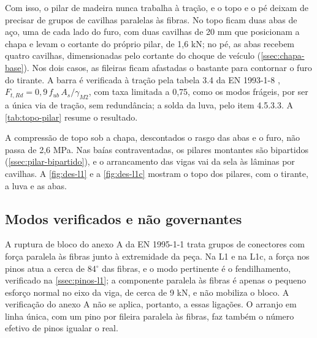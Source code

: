 Com isso, o pilar de madeira nunca trabalha à tração, e o topo e o pé deixam de
precisar de grupos de cavilhas paralelas às fibras. No topo ficam duas abas de aço,
uma de cada lado do furo, com duas cavilhas de 20 mm que posicionam a chapa e
levam o cortante do próprio pilar, de 1,6 kN; no pé, as abas recebem quatro
cavilhas, dimensionadas pelo cortante do choque de veículo
(\autoref{ssec:chapa-base}). Nos dois casos, as fileiras ficam afastadas o
bastante para contornar o furo do tirante. A barra é verificada à tração pela
tabela 3.4 da EN 1993-1-8 \cite{EN1993-1-8:2005}, $F_{t,Rd} = 0{,}9\,f_{ub}\,A_s/
\gamma_{M2}$, com taxa limitada a 0,75, como os modos frágeis, por ser a única via
de tração, sem redundância; a solda da luva, pelo item 4.5.3.3. A
\autoref{tab:topo-pilar} resume o resultado.


A compressão de topo sob a chapa, descontados o rasgo das abas e o furo, não
passa de 2,6 MPa. Nas baías contraventadas, os pilares montantes são bipartidos
(\autoref{ssec:pilar-bipartido}), e o arrancamento das vigas vai da sela às
lâminas por cavilhas. A \autoref{fig:des-l1} e a \autoref{fig:des-l1c} mostram o
topo dos pilares, com o tirante, a luva e as abas.

\subsection{Modos verificados e não governantes}\label{ssec:modos-nao-governantes}

A ruptura de bloco do anexo A da EN 1995-1-1 trata grupos de conectores com
força paralela às fibras junto à extremidade da peça. Na L1 e na L1c, a força
nos pinos atua a cerca de 84$^{\circ}$ das fibras, e o modo pertinente é o
fendilhamento, verificado na \autoref{ssec:pinos-l1}; a componente paralela às
fibras é apenas o pequeno esforço normal no eixo da viga, de cerca de 9 kN, e não
mobiliza o bloco. A verificação do anexo A não se aplica, portanto, a essas
ligações. O arranjo em linha única, com um pino por fileira paralela às fibras,
faz também o número efetivo de pinos igualar o real.

